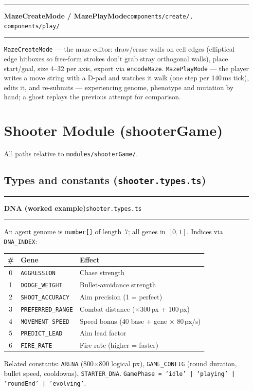 \documentclass[11pt,a4paper]{report}
\newcommand{\srcfile}[1]{\texttt{\small #1}}   %
\newcommand{\ts}[1]{\texttt{#1}}               %
\newenvironment{apientry}[2]{%
  \par\medskip\noindent
  \begin{minipage}{\textwidth}
  \hrule\vspace{0.6ex}
  {\large\ttfamily\bfseries #1}\hfill{\footnotesize\srcfile{#2}}
  \vspace{0.4ex}\hrule\medskip
}{%
  \end{minipage}\par\medskip
}
\begin{document}
\begin{apientry}{MazeCreateMode / MazePlayMode}{components/create/, components/play/}
\ts{MazeCreateMode} --- the maze editor: draw/erase walls on cell edges
(elliptical edge hitboxes so free-form strokes don't grab stray
orthogonal walls), place start/goal, size 4--32 per axis, export via
\ts{encodeMaze}. \ts{MazePlayMode} --- the player writes a move string
with a D-pad and watches it walk (one step per 140\,ms tick), edits it,
and re-submits --- experiencing genome, phenotype and mutation by hand;
a ghost replays the previous attempt for comparison.
\end{apientry}

\chapter{Shooter Module (shooterGame)}
\label{ch:api-shooter}

All paths relative to \srcfile{modules/shooterGame/}.

\section{Types and constants (\srcfile{shooter.types.ts})}

\begin{apientry}{DNA (worked example)}{shooter.types.ts}
An agent genome is \ts{number[]} of length~7; all genes in $[0,1]$.
Indices via \ts{DNA\_INDEX}:
\begin{center}
\begin{tabularx}{\textwidth}{c l X}
  \toprule
  \# & \textbf{Gene} & \textbf{Effect} \\
  \midrule
  0 & \ts{AGGRESSION}      & Chase strength \\
  1 & \ts{DODGE\_WEIGHT}   & Bullet-avoidance strength \\
  2 & \ts{SHOOT\_ACCURACY} & Aim precision (1 = perfect) \\
  3 & \ts{PREFERRED\_RANGE}& Combat distance ($\times$300\,px + 100\,px) \\
  4 & \ts{MOVEMENT\_SPEED} & Speed bonus (40 base + gene $\times$ 80\,px/s) \\
  5 & \ts{PREDICT\_LEAD}   & Aim lead factor \\
  6 & \ts{FIRE\_RATE}      & Fire rate (higher = faster) \\
  \bottomrule
\end{tabularx}
\end{center}
Related constants: \ts{ARENA} (800$\times$800 logical px),
\ts{GAME\_CONFIG} (round duration, bullet speed, cooldowns),
\ts{STARTER\_DNA}. \ts{GamePhase = 'idle' | 'playing' | 'roundEnd' |
'evolving'}.
\end{apientry}
\end{document}
